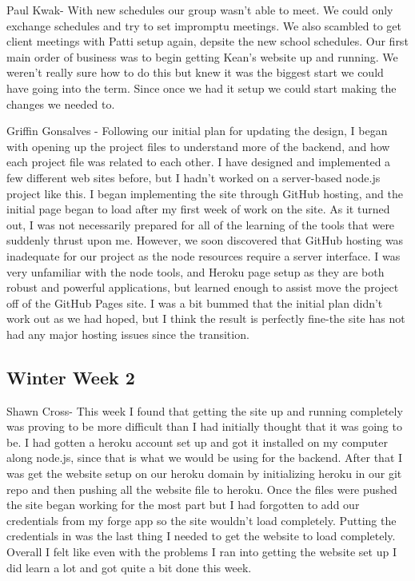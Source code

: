 \documentclass[10pt,draftclsnofoot,onecolumn]{IEEEtran}
\begin{document}
Paul Kwak- With new schedules our group wasn't able to meet. We could only exchange schedules and try to set impromptu meetings. We also scambled to get client meetings with Patti setup again, depsite the new school schedules. Our first main order of business was to begin getting Kean's website up and running. We weren't really sure how to do this but knew it was the biggest start we could have going into the term. Since once we had it setup we could start making the changes we needed to.

Griffin Gonsalves - Following our initial plan for updating the design, I began with opening up the project files to understand more of the backend, and how each project file was related to each other. I have designed and implemented a few different web sites before, but I hadn't worked on a server-based node.js project like this.  I began implementing the site through GitHub hosting, and the initial page began to load after my first week of work on the site. As it turned out, I was not necessarily prepared for all of the learning of the tools that were suddenly thrust upon me. However, we soon discovered that GitHub hosting was inadequate for our project as the node resources require a server interface. I was very unfamiliar with the node tools, and Heroku page setup as they are both robust and powerful applications, but learned enough to assist move the project off of the GitHub Pages site. I was a bit bummed that the initial plan didn't work out as we had hoped, but I think the result is perfectly fine-the site has not had any major hosting issues since the transition.

\subsection{Winter Week 2}
Shawn Cross- This week I found that getting the site up and running completely was proving to be more difficult than I had initially thought that it was going to be. I had gotten a heroku account set up and got it installed on my computer along node.js, since that is what we would be using for the backend. After that I was get the website setup on our heroku domain by initializing heroku in our git repo and then pushing all the website file to heroku. Once the files were pushed the site began working for the most part but I had forgotten to add our credentials from my forge app so the site wouldn't load completely. Putting the credentials in was the last thing I needed to get the website to load completely. Overall I felt like even with the problems I ran into getting the website set up I did learn a lot and got quite a bit done this week. 
\end{document}
